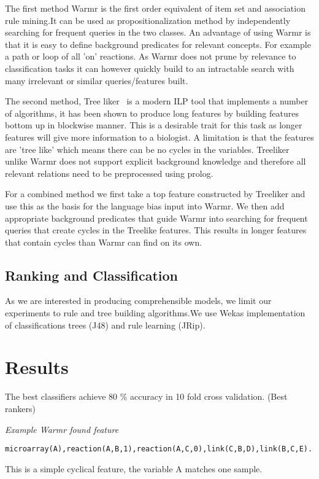 \documentclass[runningheads,a4paper]{llncs}
\begin{document}
The first method Warmr \citep{dehaspe_mining_1997} is the first order equivalent of item set and association rule mining.It can be used as propositionalization method by independently searching for frequent queries in the two classes. An advantage of using Warmr is that it is easy to define background predicates for relevant concepts. For example a path or loop of all 'on' reactions. As Warmr does not prune by relevance to classification tasks it can however quickly build to an intractable search with many irrelevant or similar queries/features built. 
	     

The second method, Tree liker~\citep{vzelezny2013fast} is a modern ILP tool that implements a number of algorithms, it has been shown to produce long features by building features bottom up in blockwise manner. This is a desirable trait for  this task as longer features will give more information to a biologist. A limitation is that the features are 'tree like' which means there can be no cycles in the variables. Treeliker unlike Warmr does not support explicit background knowledge and therefore all relevant relations need to be preprocessed using prolog.

For a combined method we first take a top feature constructed by Treeliker and use this as the basis for the language bias input into Warmr. We then add appropriate background predicates that guide Warmr into searching for frequent queries that create cycles in the Treelike features. This results in longer features that contain cycles than Warmr can find on its own. 
	     
\subsection{Ranking and Classification}
As we are interested in producing comprehensible models, we limit our experiments to rule and tree building algorithms.We use Wekas implementation of classifications trees (J48) and rule learning (JRip). 
	     
\section{Results}
The best classifiers achieve 80 \% accuracy in 10 fold cross validation.
(Best rankers)
\newline

\noindent
{\it{Example Warmr found feature}}

\begin{verbatim}
microarray(A),reaction(A,B,1),reaction(A,C,0),link(C,B,D),link(B,C,E).
\end{verbatim}
\noindent 
This is a simple cyclical feature, the variable A matches one sample. 
\newline
\end{document}
